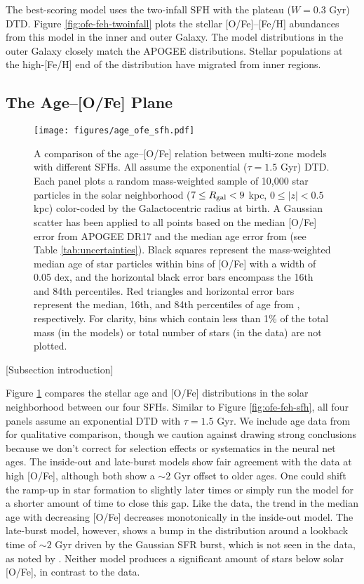 \documentclass[twocolumn,twocolappendix,linenumbers,trackchanges]{aastex631}
\begin{document}
The best-scoring model uses the two-infall SFH with the plateau ($W=0.3$ Gyr) DTD. Figure \ref{fig:ofe-feh-twoinfall} plots the stellar [O/Fe]--[Fe/H] abundances from this model in the inner and outer Galaxy. The model distributions in the outer Galaxy closely match the APOGEE distributions. Stellar populations at the high-[Fe/H] end of the distribution have migrated from inner regions.

\subsection{The Age--[O/Fe] Plane}
\label{sec:age-ofe}

\begin{figure}
    \centering
    \texttt{[image: figures/age\_ofe\_sfh.pdf]}
    \caption{A comparison of the age--[O/Fe] relation between multi-zone models with different SFHs. All assume the exponential ($\tau=1.5$ Gyr) DTD. Each panel plots a random mass-weighted sample of 10,000 star particles in the solar neighborhood ($7\leq R_{\rm gal}<9$ kpc, $0\leq|z|<0.5$ kpc) color-coded by the Galactocentric radius at birth. A Gaussian scatter has been applied to all points based on the median [O/Fe] error from APOGEE DR17 and the median age error from  (see Table \ref{tab:uncertainties}). Black squares represent the mass-weighted median age of star particles within bins of [O/Fe] with a width of 0.05 dex, and the horizontal black error bars encompass the 16th and 84th percentiles. Red triangles and horizontal error bars represent the median, 16th, and 84th percentiles of age from , respectively. For clarity, bins which contain less than 1\% of the total mass (in the models) or total number of stars (in the data) are not plotted.}
    \label{fig:age-ofe-sfh}
\end{figure}

[Subsection introduction]

Figure \ref{fig:age-ofe-sfh} compares the stellar age and [O/Fe] distributions in the solar neighborhood between our four SFHs. Similar to Figure \ref{fig:ofe-feh-sfh}, all four panels assume an exponential DTD with $\tau=1.5$ Gyr. We include age data from  for qualitative comparison, though we caution against drawing strong conclusions because we don't correct for selection effects or systematics in the neural net ages. The inside-out and late-burst models show fair agreement with the data at high [O/Fe], although both show a $\sim2$ Gyr offset to older ages. One could shift the ramp-up in star formation to slightly later times or simply run the model for a shorter amount of time to close this gap. Like the data, the trend in the median age with decreasing [O/Fe] decreases monotonically in the inside-out model. The late-burst model, however, shows a bump in the distribution around a lookback time of $\sim2$ Gyr driven by the Gaussian SFR burst, which is not seen in the data, as noted by . Neither model produces a significant amount of stars below solar [O/Fe], in contrast to the data.
\end{document}
